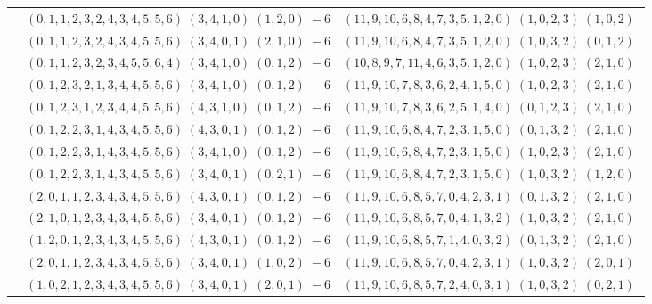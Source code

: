 \documentclass[11pt]{article}
\begin{document}
\begin{longtable}[l]{|c|c|c|}
 \cline{2-3} 
 & $(0 ,1 ,1 ,2 ,3 ,2 ,4 ,3 ,4 ,5 ,5 ,6) \;(3 ,4 ,1 ,0) \;(1 ,2 ,0) \;-6$ & $(11 ,9 ,10 ,6 ,8 ,4 ,7 ,3 ,5 ,1 ,2 ,0) \;(1 ,0 ,2 ,3) \;(1 ,0 ,2) \;$\\ 
 \cline{2-3} 
 & $(0 ,1 ,1 ,2 ,3 ,2 ,4 ,3 ,4 ,5 ,5 ,6) \;(3 ,4 ,0 ,1) \;(2 ,1 ,0) \;-6$ & $(11 ,9 ,10 ,6 ,8 ,4 ,7 ,3 ,5 ,1 ,2 ,0) \;(1 ,0 ,3 ,2) \;(0 ,1 ,2) \;$\\ 
 \cline{2-3} 
 & $(0 ,1 ,1 ,2 ,3 ,2 ,3 ,4 ,5 ,5 ,6 ,4) \;(3 ,4 ,1 ,0) \;(0 ,1 ,2) \;-6$ & $(10 ,8 ,9 ,7 ,11 ,4 ,6 ,3 ,5 ,1 ,2 ,0) \;(1 ,0 ,2 ,3) \;(2 ,1 ,0) \;$\\ 
 \cline{2-3} 
 & $(0 ,1 ,2 ,3 ,2 ,1 ,3 ,4 ,4 ,5 ,5 ,6) \;(3 ,4 ,1 ,0) \;(0 ,1 ,2) \;-6$ & $(11 ,9 ,10 ,7 ,8 ,3 ,6 ,2 ,4 ,1 ,5 ,0) \;(1 ,0 ,2 ,3) \;(2 ,1 ,0) \;$\\ 
 \cline{2-3} 
 & $(0 ,1 ,2 ,3 ,1 ,2 ,3 ,4 ,4 ,5 ,5 ,6) \;(4 ,3 ,1 ,0) \;(0 ,1 ,2) \;-6$ & $(11 ,9 ,10 ,7 ,8 ,3 ,6 ,2 ,5 ,1 ,4 ,0) \;(0 ,1 ,2 ,3) \;(2 ,1 ,0) \;$\\ 
 \cline{2-3} 
 & $(0 ,1 ,2 ,2 ,3 ,1 ,4 ,3 ,4 ,5 ,5 ,6) \;(4 ,3 ,0 ,1) \;(0 ,1 ,2) \;-6$ & $(11 ,9 ,10 ,6 ,8 ,4 ,7 ,2 ,3 ,1 ,5 ,0) \;(0 ,1 ,3 ,2) \;(2 ,1 ,0) \;$\\ 
 \cline{2-3} 
 & $(0 ,1 ,2 ,2 ,3 ,1 ,4 ,3 ,4 ,5 ,5 ,6) \;(3 ,4 ,1 ,0) \;(0 ,1 ,2) \;-6$ & $(11 ,9 ,10 ,6 ,8 ,4 ,7 ,2 ,3 ,1 ,5 ,0) \;(1 ,0 ,2 ,3) \;(2 ,1 ,0) \;$\\ 
 \cline{2-3} 
 & $(0 ,1 ,2 ,2 ,3 ,1 ,4 ,3 ,4 ,5 ,5 ,6) \;(3 ,4 ,0 ,1) \;(0 ,2 ,1) \;-6$ & $(11 ,9 ,10 ,6 ,8 ,4 ,7 ,2 ,3 ,1 ,5 ,0) \;(1 ,0 ,3 ,2) \;(1 ,2 ,0) \;$\\ 
 \cline{2-3} 
 & $(2 ,0 ,1 ,1 ,2 ,3 ,4 ,3 ,4 ,5 ,5 ,6) \;(4 ,3 ,0 ,1) \;(0 ,1 ,2) \;-6$ & $(11 ,9 ,10 ,6 ,8 ,5 ,7 ,0 ,4 ,2 ,3 ,1) \;(0 ,1 ,3 ,2) \;(2 ,1 ,0) \;$\\ 
 \cline{2-3} 
 & $(2 ,1 ,0 ,1 ,2 ,3 ,4 ,3 ,4 ,5 ,5 ,6) \;(3 ,4 ,0 ,1) \;(0 ,1 ,2) \;-6$ & $(11 ,9 ,10 ,6 ,8 ,5 ,7 ,0 ,4 ,1 ,3 ,2) \;(1 ,0 ,3 ,2) \;(2 ,1 ,0) \;$\\ 
 \cline{2-3} 
 & $(1 ,2 ,0 ,1 ,2 ,3 ,4 ,3 ,4 ,5 ,5 ,6) \;(4 ,3 ,0 ,1) \;(0 ,1 ,2) \;-6$ & $(11 ,9 ,10 ,6 ,8 ,5 ,7 ,1 ,4 ,0 ,3 ,2) \;(0 ,1 ,3 ,2) \;(2 ,1 ,0) \;$\\ 
 \cline{2-3} 
 & $(2 ,0 ,1 ,1 ,2 ,3 ,4 ,3 ,4 ,5 ,5 ,6) \;(3 ,4 ,0 ,1) \;(1 ,0 ,2) \;-6$ & $(11 ,9 ,10 ,6 ,8 ,5 ,7 ,0 ,4 ,2 ,3 ,1) \;(1 ,0 ,3 ,2) \;(2 ,0 ,1) \;$\\ 
 \cline{2-3} 
 & $(1 ,0 ,2 ,1 ,2 ,3 ,4 ,3 ,4 ,5 ,5 ,6) \;(3 ,4 ,0 ,1) \;(2 ,0 ,1) \;-6$ & $(11 ,9 ,10 ,6 ,8 ,5 ,7 ,2 ,4 ,0 ,3 ,1) \;(1 ,0 ,3 ,2) \;(0 ,2 ,1) \;$\\ 

\end{longtable}
\end{document}
